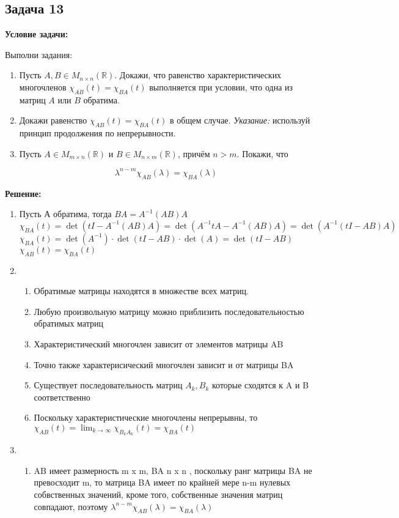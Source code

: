 \documentclass[a4paper,12pt]{article}
\begin{document}
\subsection{Задача 13}

\textbf{Условие задачи:}

Выполни задания:

\begin{enumerate}
    \item Пусть \( A, B \in M_{n \times n}(\mathbb{R}) \). Докажи, что равенство характеристических многочленов \( \chi_{AB}(t) = \chi_{BA}(t) \) выполняется при условии, что одна из матриц \( A \) или \( B \) обратима.
    \item Докажи равенство \( \chi_{AB}(t) = \chi_{BA}(t) \) в общем случае. \textit{Указание:} используй принцип продолжения по непрерывности.
    \item Пусть \( A \in M_{m \times n}(\mathbb{R}) \) и \( B \in M_{n \times m}(\mathbb{R}) \), причём \( n > m \). Покажи, что

    \[
    \lambda^{n - m} \chi_{AB}(\lambda) = \chi_{BA}(\lambda)
    \]
\end{enumerate}

\textbf{Решение:}
\begin{enumerate}
    \item   Пусть А обратима, тогда $BA = A^{-1}(AB)A$
            $\chi_{BA}(t) = \det(tI-A^{-1}(AB)A)=\det(A^{-1}tA-A^{-1}(AB)A)=\det(A^{-1}(tI-AB)A)$\\
            
            $\chi_{BA}(t)=\det(A^{-1})\cdot \det(tI-AB)\cdot \det(A)=\det(tI-AB)$
            $\chi_{AB}(t) = \chi_{BA}(t)$
    \item   \begin{enumerate}
                \item Обратимые матрицы находятся в множестве всех матриц.
                \item Любую произвольную матрицу можно приблизить последовательностью обратимых матриц
                \item Характеристический многочлен зависит от элементов матрицы AB
                \item Точно также характерисический многочлен зависит и от матрицы BA
                \item Существует последовательность матриц $A_k, B_k$ которые сходятся к A и B соответственно
                \item Поскольку характеристические многочлены непрерывны, то $\chi_{AB}(t)=\lim_{k \to \infty} \chi_{B_k A_k}(t) = \chi_{BA}(t)$
            \end{enumerate}
    \item   \begin{enumerate}
                \item AB имеет размерность m x m, BA n x n , поскольку ранг матрицы BA не превосходит m, то матрица BA имеет по крайней мере n-m нулевых собвственных значений, кроме того, собственные значения матриц совпадают, поэтому $\lambda^{n - m}\chi_{AB}(\lambda) = \chi_{BA}(\lambda)$
            \end{enumerate}
\end{enumerate}
\end{document}
